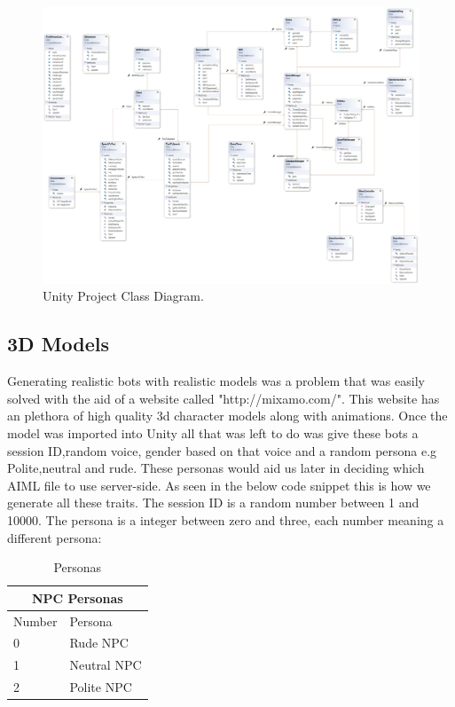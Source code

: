 \begin{figure}[h!]
	\caption{Unity Project Class Diagram.}
	\label{image:ClassDiagram}
	\centering
	\includegraphics[width=1\textwidth]{Images/ClassDiagram.png}
\end{figure}

\subsection{3D Models}
Generating realistic bots with realistic models was a problem that was easily solved with the aid of a website called "http://mixamo.com/". This website has an plethora of high quality 3d character models along with animations. Once the model was imported into Unity all that was left to do was give these bots a session ID,random voice, gender based on that voice and a random persona e.g Polite,neutral and rude. These personas would aid us later in deciding which AIML file to use server-side. As seen in the below code snippet this is how we generate all these traits. The session ID is a random number between 1 and 10000. The persona is a integer between zero and three, each number meaning a different persona: 

\begin{table}[!ht]
    \centering
\begin{tabular}{ |p{3cm}|p{5cm}|  }
\hline
\multicolumn{2}{|c|}{NPC Personas} \\
\hline
Number & Persona \\
\hline
0 & Rude NPC \\
\hline
1 & Neutral NPC \\
\hline
2 & Polite NPC \\
\hline

\end{tabular}
    \caption{Personas}
    \label{tab:my_label}
\end{table}


